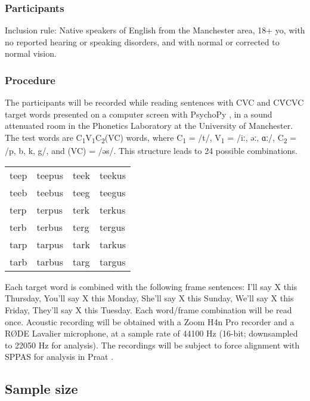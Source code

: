 \documentclass[11pt,]{article}
\begin{document}
\hypertarget{participants}{%
\subsubsection{Participants}\label{participants}}

Inclusion rule: Native speakers of English from the Manchester area, 18+
yo, with no reported hearing or speaking disorders, and with normal or
corrected to normal vision.

\hypertarget{procedure}{%
\subsubsection{Procedure}\label{procedure}}

\label{s:procedure}

The participants will be recorded while reading sentences with CVC and
CV́CVC target words presented on a computer screen with PsychoPy
\citep{peirce2009}, in a sound attenuated room in the Phonetics
Laboratory at the University of Manchester. The test words are
C\textsubscript{1}V\textsubscript{1}C\textsubscript{2}(VC) words, where
C\textsubscript{1} = /t/, V\textsubscript{1} = /iː, əː, ɑː/,
C\textsubscript{2} = /p, b, k, g/, and (VC) = /əs/. This structure leads
to 24 possible combinations.

\begin{tabular}{llll}
teep & teepus & teek & teekus \\
teeb & teebus & teeg & teegus \\
terp & terpus & terk & terkus \\
terb & terbus & terg & tergus \\
tarp & tarpus & tark & tarkus \\
tarb & tarbus & targ & targus \\
\end{tabular}

Each target word is combined with the following frame sentences: I'll
say X this Thursday, You'll say X this Monday, She'll say X this Sunday,
We'll say X this Friday, They'll say X this Tuesday. Each word/frame
combination will be read once. Acoustic recording will be obtained with
a Zoom H4n Pro recorder and a RØDE Lavalier microphone, at a sample rate
of 44100 Hz (16-bit; downsampled to 22050 Hz for analysis). The
recordings will be subject to force alignment with SPPAS
\citep{bigi2015} for analysis in Praat \citep{boersma2018}.

\hypertarget{sample-size}{%
\subsection{Sample size}\label{sample-size}}
\end{document}
